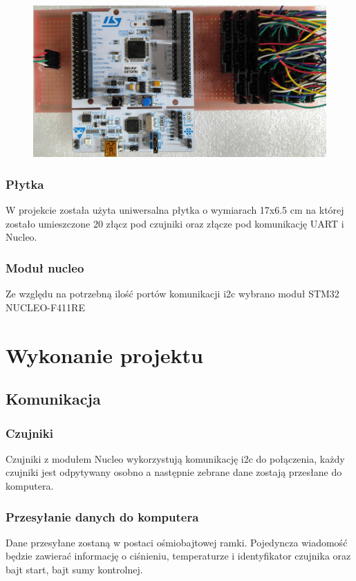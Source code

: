 \documentclass[a4paper,12pt]{article}
\begin{document}
			\begin{figure}[H]
		     	 \includegraphics[width=1\textwidth]{obrazy/plytka.jpg}
			\end{figure}
		
			\subsubsection{Płytka}
				W projekcie została użyta uniwersalna płytka o wymiarach 17x6.5 cm na której zostało umieszczone 20 złącz pod czujniki oraz złącze pod komunikację UART i Nucleo. 
						
			\subsubsection{Moduł nucleo}
				Ze względu na potrzebną ilość portów komunikacji i2c wybrano moduł STM32 NUCLEO-F411RE
			
	\section{Wykonanie projektu}		
		\subsection{Komunikacja}
			\subsubsection{Czujniki}		
				Czujniki z modułem Nucleo wykorzystują komunikację i2c do połączenia, każdy czujniki jest odpytywany osobno a następnie zebrane dane zostają przesłane do komputera. 
			\subsubsection{Przesyłanie danych do komputera}
			Dane przesyłane zostaną w postaci ośmiobajtowej ramki. Pojedyncza wiadomość będzie zawierać informację o ciśnieniu, temperaturze i identyfikator czujnika oraz bajt start, bajt sumy kontrolnej.
\end{document}

